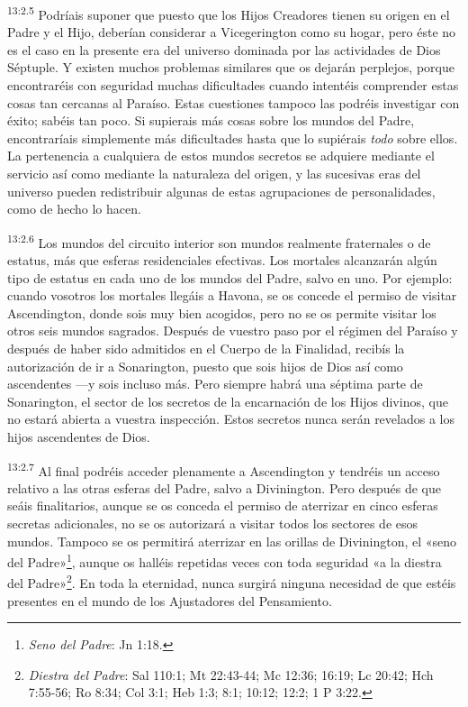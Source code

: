 \par
\textsuperscript{13:2.5} Podríais suponer que puesto que los Hijos Creadores tienen su origen en el Padre y el Hijo, deberían considerar a Vicegerington como su hogar, pero éste no es el caso en la presente era del universo dominada por las actividades de Dios Séptuple. Y existen muchos problemas similares que os dejarán perplejos, porque encontraréis con seguridad muchas dificultades cuando intentéis comprender estas cosas tan cercanas al Paraíso. Estas cuestiones tampoco las podréis investigar con éxito; sabéis tan poco. Si supierais más cosas sobre los mundos del Padre, encontraríais simplemente más dificultades hasta que lo supiérais \textit{todo} sobre ellos. La pertenencia a cualquiera de estos mundos secretos se adquiere mediante el servicio así como mediante la naturaleza del origen, y las sucesivas eras del universo pueden redistribuir algunas de estas agrupaciones de personalidades, como de hecho lo hacen.

\par
\textsuperscript{13:2.6} Los mundos del circuito interior son mundos realmente fraternales o de estatus, más que esferas residenciales efectivas. Los mortales alcanzarán algún tipo de estatus en cada uno de los mundos del Padre, salvo en uno. Por ejemplo: cuando vosotros los mortales llegáis a Havona, se os concede el permiso de visitar Ascendington, donde sois muy bien acogidos, pero no se os permite visitar los otros seis mundos sagrados. Después de vuestro paso por el régimen del Paraíso y después de haber sido admitidos en el Cuerpo de la Finalidad, recibís la autorización de ir a Sonarington, puesto que sois hijos de Dios así como ascendentes ---y sois incluso más. Pero siempre habrá una séptima parte de Sonarington, el sector de los secretos de la encarnación de los Hijos divinos, que no estará abierta a vuestra inspección. Estos secretos nunca serán revelados a los hijos ascendentes de Dios.

\par
\textsuperscript{13:2.7} Al final podréis acceder plenamente a Ascendington y tendréis un acceso relativo a las otras esferas del Padre, salvo a Divinington. Pero después de que seáis finalitarios, aunque se os conceda el permiso de aterrizar en cinco esferas secretas adicionales, no se os autorizará a visitar todos los sectores de esos mundos. Tampoco se os permitirá aterrizar en las orillas de Divinington, el «seno del Padre»\footnote{\textit{Seno del Padre}: Jn 1:18.}, aunque os halléis repetidas veces con toda seguridad «a la diestra del Padre»\footnote{\textit{Diestra del Padre}: Sal 110:1; Mt 22:43-44; Mc 12:36; 16:19; Lc 20:42; Hch 7:55-56; Ro 8:34; Col 3:1; Heb 1:3; 8:1; 10:12; 12:2; 1 P 3:22.}. En toda la eternidad, nunca surgirá ninguna necesidad de que estéis presentes en el mundo de los Ajustadores del Pensamiento.

